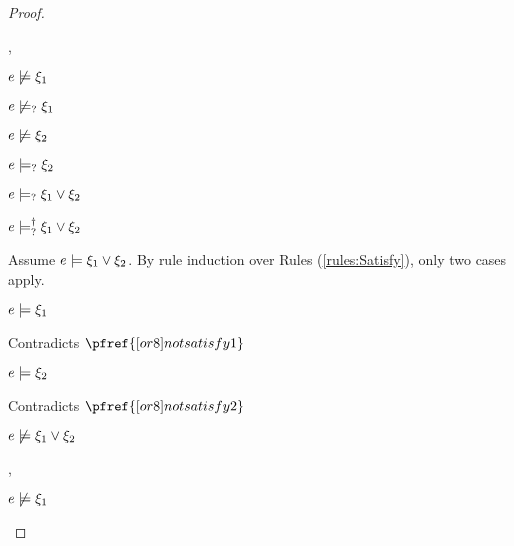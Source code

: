 \begin{proof}
\begin{byCases}
\begin{byCases}
    \item[\cnotsatisfyormay{e}{\xi_1},\cmaysatisfy{e}{\xi_2}]
        \begin{pfsteps*}
        \item $e \not\models \xi_1$  
        \item $e \not\models_{?} \xi_1$  
        \item $e \not\models \xi_2$  
        \item $e \models_{?} \xi_2$  
        \item $e \models_{?} \xi_1 \vee \xi_2$  
        \item $e \models_{?}^{\dag} \xi_1 \vee \xi_2$ 
        \end{pfsteps*}
        Assume $e \models \xi_1 \vee \xi_2$. By rule induction over Rules (\ref{rules:Satisfy}), only two cases apply.
        \begin{byCases}
        \item[\text{(\ref{rule:CSOr1})}]
            \begin{pfsteps*}
            \item $e \models \xi_1$ 
            \end{pfsteps*}
            Contradicts $\pfref{[or8]notsatisfy1}$
        \item[\text{(\ref{rule:CSOr2})}]
            \begin{pfsteps*}
            \item $e \models \xi_2$ 
            \end{pfsteps*}
            Contradicts $\pfref{[or8]notsatisfy2}$
        \end{byCases}
        \begin{pfsteps*}
        \item $e \not\models \xi_1 \vee \xi_2$ 
        \end{pfsteps*}
    \item[\cnotsatisfyormay{e}{\xi_1},\cnotsatisfyormay{e}{\xi_2}]
        \begin{pfsteps*}
        \item $e \not\models \xi_1$  

\end{pfsteps*}
\end{byCases}
\end{byCases}
\end{proof}
